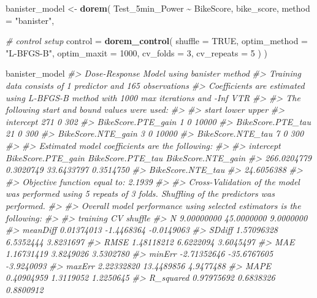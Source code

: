 \documentclass[
]{book}
\newenvironment{Shaded}{\begin{snugshade}}{\end{snugshade}}
\newcommand{\CommentTok}[1]{\textcolor[rgb]{0.56,0.35,0.01}{\textit{#1}}}
\newcommand{\DataTypeTok}[1]{\textcolor[rgb]{0.13,0.29,0.53}{#1}}
\newcommand{\DecValTok}[1]{\textcolor[rgb]{0.00,0.00,0.81}{#1}}
\newcommand{\KeywordTok}[1]{\textcolor[rgb]{0.13,0.29,0.53}{\textbf{#1}}}
\newcommand{\NormalTok}[1]{#1}
\newcommand{\OperatorTok}[1]{\textcolor[rgb]{0.81,0.36,0.00}{\textbf{#1}}}
\newcommand{\OtherTok}[1]{\textcolor[rgb]{0.56,0.35,0.01}{#1}}
\newcommand{\StringTok}[1]{\textcolor[rgb]{0.31,0.60,0.02}{#1}}
\begin{document}
\begin{Shaded}
\begin{Highlighting}[]
\NormalTok{banister\_model <{-}}\StringTok{ }\KeywordTok{dorem}\NormalTok{(}
\NormalTok{   Test\_5min\_Power }\OperatorTok{\textasciitilde{}}\StringTok{ }\NormalTok{BikeScore,}
\NormalTok{   bike\_score,}
   \DataTypeTok{method =} \StringTok{"banister"}\NormalTok{,}
   
   \CommentTok{\# control setup}
   \DataTypeTok{control =} \KeywordTok{dorem\_control}\NormalTok{(}
    \DataTypeTok{shuffle =} \OtherTok{TRUE}\NormalTok{,}
    \DataTypeTok{optim\_method =} \StringTok{"L{-}BFGS{-}B"}\NormalTok{,}
    \DataTypeTok{optim\_maxit =} \DecValTok{1000}\NormalTok{,}
    \DataTypeTok{cv\_folds =} \DecValTok{3}\NormalTok{,}
    \DataTypeTok{cv\_repeats =} \DecValTok{5}
\NormalTok{   )}
\NormalTok{)   }

\NormalTok{banister\_model}
\CommentTok{\#> Dose{-}Response Model using banister method}
\CommentTok{\#> Training data consists of 1 predictor and 165 observations}
\CommentTok{\#> Coefficients are estimated using L{-}BFGS{-}B method with 1000 max iterations and {-}Inf VTR}
\CommentTok{\#> }
\CommentTok{\#> The following start and bound values were used:}
\CommentTok{\#> }
\CommentTok{\#>                    start lower upper}
\CommentTok{\#> intercept            271     0   302}
\CommentTok{\#> BikeScore.PTE\_gain     1     0 10000}
\CommentTok{\#> BikeScore.PTE\_tau     21     0   300}
\CommentTok{\#> BikeScore.NTE\_gain     3     0 10000}
\CommentTok{\#> BikeScore.NTE\_tau      7     0   300}
\CommentTok{\#> }
\CommentTok{\#> Estimated model coefficients are the following:}
\CommentTok{\#> }
\CommentTok{\#>          intercept BikeScore.PTE\_gain  BikeScore.PTE\_tau BikeScore.NTE\_gain }
\CommentTok{\#>        266.0204779          0.3020749         33.6433797          0.3514750 }
\CommentTok{\#>  BikeScore.NTE\_tau }
\CommentTok{\#>         24.6056388 }
\CommentTok{\#> }
\CommentTok{\#> Objective function equal to: 2.1939 }
\CommentTok{\#> }
\CommentTok{\#> Cross{-}Validation of the model was performed using 5 repeats of 3 folds. Shuffling of the predictors was performed.}
\CommentTok{\#> }
\CommentTok{\#> Overall model performance using selected estimators is the following:}
\CommentTok{\#> }
\CommentTok{\#>              training          CV    shuffle}
\CommentTok{\#> N          9.00000000  45.0000000  9.0000000}
\CommentTok{\#> meanDiff   0.01374013  {-}1.4468364 {-}0.0149063}
\CommentTok{\#> SDdiff     1.57096328   6.5352444  3.8231697}
\CommentTok{\#> RMSE       1.48118212   6.6222094  3.6045497}
\CommentTok{\#> MAE        1.16731419   3.8249026  3.5302780}
\CommentTok{\#> minErr    {-}2.71352646 {-}35.6767605 {-}3.9240093}
\CommentTok{\#> maxErr     2.22332820  13.4489856  4.9477488}
\CommentTok{\#> MAPE       0.40904959   1.3119052  1.2250645}
\CommentTok{\#> R\_squared  0.97975692   0.6838326  0.8800912}
\end{Highlighting}
\end{Shaded}
\end{document}
